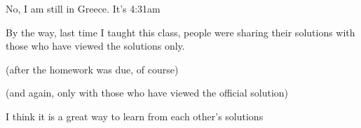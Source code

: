 




No, I am still in Greece. It's 4:31am











By the way, last time I taught this class, people were sharing their solutions with those who have viewed the solutions only.


(after the homework was due, of course)

(and again, only with those who have viewed the official solution)

I think it is a great way to learn from each other's solutions

